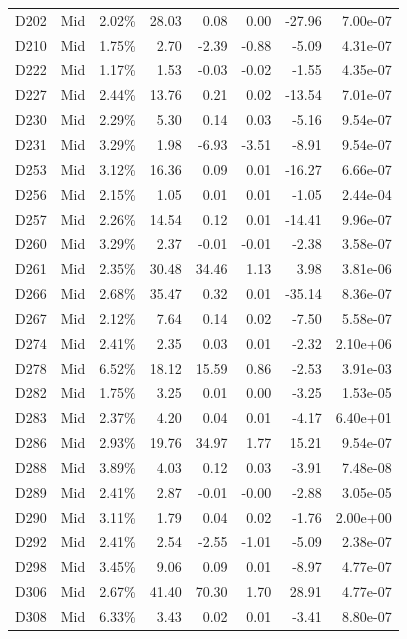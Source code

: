 \begin{tabular}{l l r r r r r r}
D202 & Mid & 2.02\% & 28.03 & 0.08 & 0.00 & -27.96 & 7.00e-07 \\
D210 & Mid & 1.75\% & 2.70 & -2.39 & -0.88 & -5.09 & 4.31e-07 \\
D222 & Mid & 1.17\% & 1.53 & -0.03 & -0.02 & -1.55 & 4.35e-07 \\
D227 & Mid & 2.44\% & 13.76 & 0.21 & 0.02 & -13.54 & 7.01e-07 \\
D230 & Mid & 2.29\% & 5.30 & 0.14 & 0.03 & -5.16 & 9.54e-07 \\
D231 & Mid & 3.29\% & 1.98 & -6.93 & -3.51 & -8.91 & 9.54e-07 \\
D253 & Mid & 3.12\% & 16.36 & 0.09 & 0.01 & -16.27 & 6.66e-07 \\
D256 & Mid & 2.15\% & 1.05 & 0.01 & 0.01 & -1.05 & 2.44e-04 \\
D257 & Mid & 2.26\% & 14.54 & 0.12 & 0.01 & -14.41 & 9.96e-07 \\
D260 & Mid & 3.29\% & 2.37 & -0.01 & -0.01 & -2.38 & 3.58e-07 \\
D261 & Mid & 2.35\% & 30.48 & 34.46 & 1.13 & 3.98 & 3.81e-06 \\
D266 & Mid & 2.68\% & 35.47 & 0.32 & 0.01 & -35.14 & 8.36e-07 \\
D267 & Mid & 2.12\% & 7.64 & 0.14 & 0.02 & -7.50 & 5.58e-07 \\
D274 & Mid & 2.41\% & 2.35 & 0.03 & 0.01 & -2.32 & 2.10e+06 \\
D278 & Mid & 6.52\% & 18.12 & 15.59 & 0.86 & -2.53 & 3.91e-03 \\
D282 & Mid & 1.75\% & 3.25 & 0.01 & 0.00 & -3.25 & 1.53e-05 \\
D283 & Mid & 2.37\% & 4.20 & 0.04 & 0.01 & -4.17 & 6.40e+01 \\
D286 & Mid & 2.93\% & 19.76 & 34.97 & 1.77 & 15.21 & 9.54e-07 \\
D288 & Mid & 3.89\% & 4.03 & 0.12 & 0.03 & -3.91 & 7.48e-08 \\
D289 & Mid & 2.41\% & 2.87 & -0.01 & -0.00 & -2.88 & 3.05e-05 \\
D290 & Mid & 3.11\% & 1.79 & 0.04 & 0.02 & -1.76 & 2.00e+00 \\
D292 & Mid & 2.41\% & 2.54 & -2.55 & -1.01 & -5.09 & 2.38e-07 \\
D298 & Mid & 3.45\% & 9.06 & 0.09 & 0.01 & -8.97 & 4.77e-07 \\
D306 & Mid & 2.67\% & 41.40 & 70.30 & 1.70 & 28.91 & 4.77e-07 \\
D308 & Mid & 6.33\% & 3.43 & 0.02 & 0.01 & -3.41 & 8.80e-07 \\

\end{tabular}
